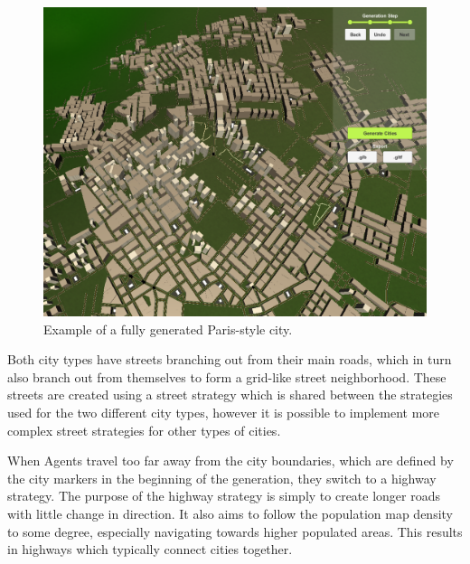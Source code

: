 \begin{figure}[H]
\begin{minipage}{.45\textwidth}
\begin{minipage}{.9\textwidth}
      \includegraphics[width=\textwidth]{figure/results/city_paris.png}
      \caption{Example of a fully generated Paris-style city.}
      \label{fig:results_city_paris}
    \end{minipage}
  \end{minipage}
\end{figure}

Both city types have streets branching out from their main roads, which in turn also branch out from themselves to form a grid-like street neighborhood.
These streets are created using a street strategy which is shared between the strategies used for the two different city types, however it is possible to implement more complex street strategies for other types of cities.

When Agents travel too far away from the city boundaries, which are defined by the city markers in the beginning of the generation, they switch to a highway strategy.
The purpose of the highway strategy is simply to create longer roads with little change in direction.
It also aims to follow the population map density to some degree, especially navigating towards higher populated areas.
This results in highways which typically connect cities together.
